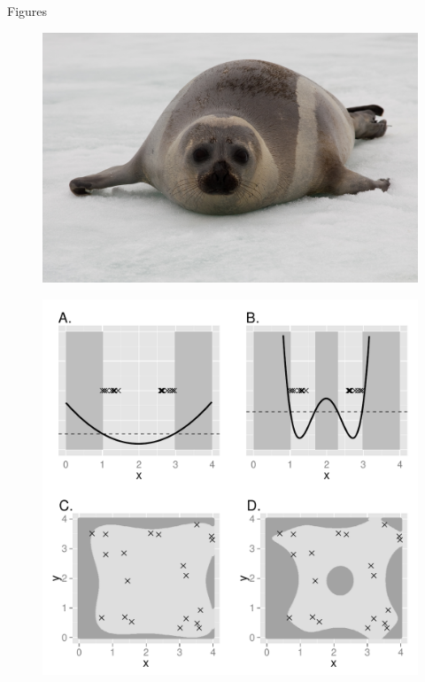 \documentclass[12pt,english]{article}
\begin{document}
\begin{spacing}{1.9}
\clearpage
\centerline{\sc Figures}



\begin{figure}[!h]
\begin{center}
\includegraphics[width=6in]{ribbon}
\end{center}
\caption{ }
\label{fig:ribbon}
\end{figure}

\begin{figure}[!h]
\begin{center}
\includegraphics[width=6in]{IVH_simple2.pdf}
\end{center}
\caption{ }
\label{fig:IVH}
\end{figure}


\end{spacing}
\end{document}
